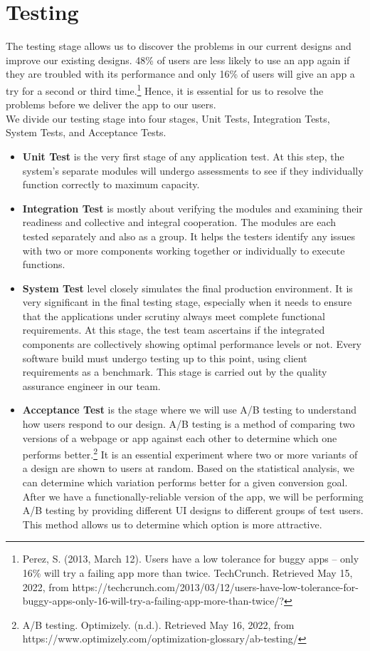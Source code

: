 \section{Testing}
\label{ch2test}
The testing stage allows us to discover the problems in our current designs and improve our existing designs. 
48\% of users are less likely to use an app again if they are troubled with its performance and only 16\% of users will give an app a try for a second or third time.\footnote{Perez, S. (2013, March 12). Users have a low tolerance for buggy apps – only 16\% will try a failing app more than twice. TechCrunch. Retrieved May 15, 2022, from https://techcrunch.com/2013/03/12/users-have-low-tolerance-for-buggy-apps-only-16-will-try-a-failing-app-more-than-twice/?} Hence, it is essential for us to resolve the problems before we deliver the app to our users.
\\We divide our testing stage into four stages, Unit Tests, Integration Tests, System Tests, and Acceptance Tests.
\begin{itemize}
\item\textbf{Unit Test} is the very first stage of any application test. At this step, the system’s separate modules will undergo assessments to see if they individually function correctly to maximum capacity. 
\item\textbf{Integration Test} is mostly about verifying the modules and examining their readiness and collective and integral cooperation. The modules are each tested separately and also as a group. It helps the testers identify any issues with two or more components working together or individually to execute functions.
\item\textbf{System Test} level closely simulates the final production environment. It is very significant in the final testing stage, especially when it needs to ensure that the applications under scrutiny always meet complete functional requirements. 
At this stage, the test team ascertains if the integrated components are collectively showing optimal performance levels or not. Every software build must undergo testing up to this point, using client requirements as a benchmark. This stage is carried out by the quality assurance engineer in our team.
\item\textbf{Acceptance Test} is the stage where we will use A/B testing to understand how users respond to our design. 
A/B testing is a method of comparing two versions of a webpage or app against each other to determine which one performs better.\footnote{A/B testing. Optimizely. (n.d.). Retrieved May 16, 2022, from https://www.optimizely.com/optimization-glossary/ab-testing/} It is an essential experiment where two or more variants of a design are shown to users at random. Based on the statistical analysis, we can determine which variation performs better for a given conversion goal.
After we have a functionally-reliable version of the app, 
we will be performing A/B testing by providing different UI designs to different groups of test users. This method allows us to 
determine which option is more attractive.\end{itemize}

